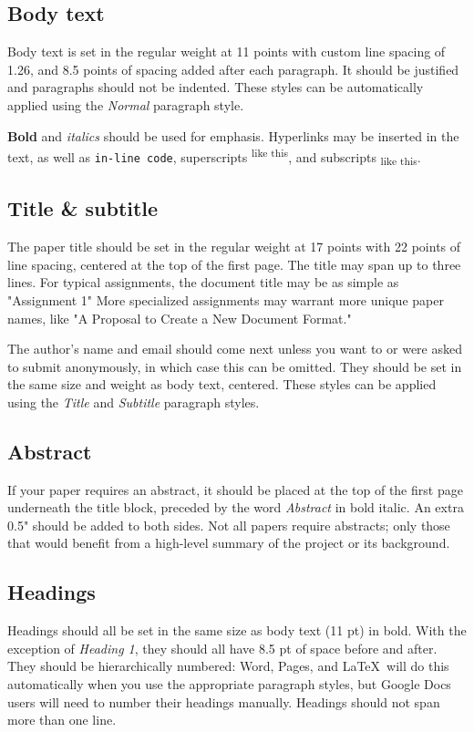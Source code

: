 \documentclass[
	letterpaper, %
]{jdf}
\begin{document}
\subsection{Body text}
Body text is set in the regular weight at 11 points with custom line spacing of 1.26, and 8.5 points of spacing added after each paragraph. It should be justified 
and paragraphs should not be indented. These styles can be automatically applied using the \emph{Normal} paragraph style.

\textbf{Bold} and \textit{italics} should be used for emphasis. Hyperlinks may be inserted in the text, as well as {\tt in-line code}, superscripts\textsuperscript{ like this}, 
and subscripts\textsubscript{ like this}.

\subsection{Title \& subtitle}
The paper title should be set in the regular weight at 17 points with 22 points of line spacing, centered at the top of the first page. The title may span up to three lines. 
For typical assignments, the document title may be as simple as "Assignment 1" More specialized assignments may warrant more unique paper names, like "A Proposal to Create a New Document Format."

The author’s name and email should come next unless you want to or were asked to submit anonymously, in which case this can be omitted. 
They should be set in the same size and weight as body text, centered. These styles can be applied using the \emph{Title} and \emph{Subtitle} paragraph styles.

\subsection{Abstract}
If your paper requires an abstract, it should be placed at the top of the first page underneath the title block, preceded by the word \emph{Abstract} in bold italic. 
An extra 0.5" should be added to both sides. Not all papers require abstracts; only those that would benefit from a high-level summary of the project or its background.

\subsection{Headings}
Headings should all be set in the same size as body text (11 pt) in bold. With the exception of \emph{Heading 1}, they should all have 8.5 pt of space before and after. 
They should be hierarchically numbered: Word, Pages, and \LaTeX\ will do this automatically when you use the appropriate paragraph styles, but Google Docs users will need to 
number their headings manually. Headings should not span more than one line.
\end{document}

